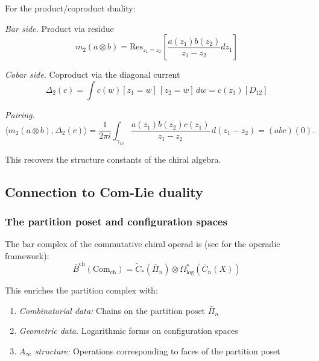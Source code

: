 \begin{example}
For the product/coproduct duality:

\emph{Bar side.} Product via residue
\[m_2(a \otimes b) = \text{Res}_{z_1=z_2}\left[\frac{a(z_1)b(z_2)}{z_1-z_2}dz_1\right]\]

\emph{Cobar side.} Coproduct via the diagonal current
\[\Delta_2(c) = \int c(w) [z_1=w]\,[z_2=w]\,dw = c(z_1)[D_{12}]\]

\emph{Pairing.}
\[\langle m_2(a \otimes b), \Delta_2(c) \rangle
=
\frac{1}{2\pi i}\int_{\gamma_{12}}
\frac{a(z_1)b(z_2)c(z_1)}{z_1-z_2}\,d(z_1-z_2)
=(abc)(0).\]

This recovers the structure constants of the chiral algebra.
\end{example}


\subsection{Connection to Com-Lie duality}

\subsubsection{The partition poset and configuration spaces}

\begin{theorem}\label{thm:geometric-com-lie-enhancement}
The bar complex of the commutative chiral operad is
(see \cite[Chapter~7]{LV12} for the operadic framework):
\[\bar{B}^{\text{ch}}(\text{Com}_{\text{ch}}) = \tilde{C}_*(\bar{\Pi}_n) \otimes \Omega^*_{\text{log}}(\overline{C}_n(X))\]

This enriches the partition complex with:
\begin{enumerate}
\item \emph{Combinatorial data:} Chains on the partition poset $\bar{\Pi}_n$
\item \emph{Geometric data.} Logarithmic forms on configuration spaces
\item \emph{$A_\infty$ structure:} Operations corresponding to faces of the partition poset
\end{enumerate}
\end{theorem}

